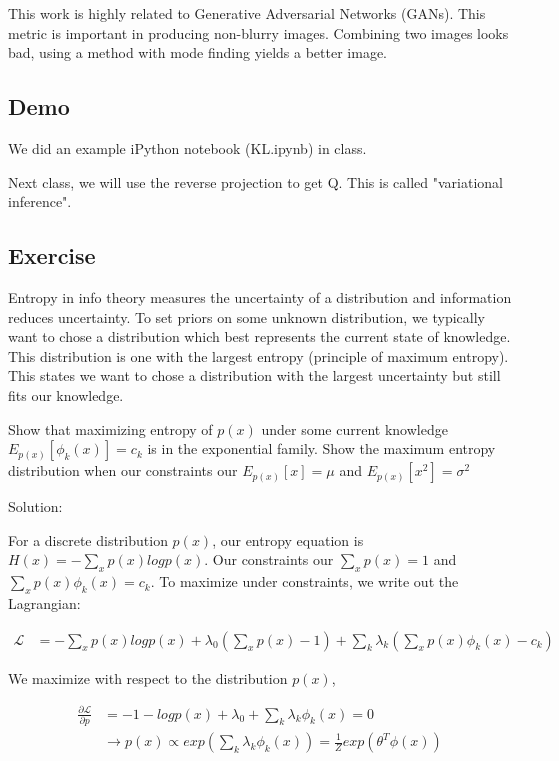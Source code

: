 \documentclass{article}
\begin{document}
\smallskip
This work is highly related to Generative Adversarial Networks (GANs). This metric is important in producing non-blurry images. Combining two images looks bad, using a method with mode finding yields a better image.

\subsection{Demo}

\smallskip
We did an example iPython notebook (KL.ipynb) in class.

\smallskip
Next class, we will use the reverse projection to get Q. This is called "variational inference".

\subsection{Exercise}

Entropy in info theory measures the uncertainty of a distribution and information reduces uncertainty. To set priors on some unknown distribution, we typically want to chose a distribution which best represents the current state of knowledge. This distribution is one with the largest entropy (principle of maximum entropy). This states we want to chose a distribution with the largest uncertainty but still fits our knowledge.

\smallskip

Show that maximizing entropy of $p(x)$ under some current knowledge $E_{p(x)}[\phi_k(x)] = c_k$ is in the exponential family. Show the maximum entropy distribution when our constraints our $E_{p(x)}[x] = \mu$ and $E_{p(x)}[x^2] = \sigma^2$ 

\bigskip

Solution:

\smallskip

For a discrete distribution $p(x)$, our entropy equation is $H(x) = - \sum_x p(x) log p(x)$. Our constraints our $\sum_x p(x) = 1$ and $ \sum_x p(x) \phi_k(x) = c_k$. To maximize under constraints, we write out the Lagrangian:

\begin{align*}
\mathcal{L} &= - \sum_x p(x) log p(x) + \lambda_0 (\sum_x p(x) - 1) + \sum_k \lambda_k (\sum_x p(x) \phi_k(x) - c_k)
\end{align*}

We maximize with respect to the distribution $p(x)$,

\begin{align*}
\frac{\partial \mathcal{L}}{\partial p} &= -1 - log p(x) + \lambda_0 + \sum_k \lambda_k \phi_k(x) = 0 \\
&\rightarrow p(x) \propto exp(\sum_k \lambda_k \phi_k(x)) = \frac{1}{Z}exp(\theta^T \phi(x))
\end{align*}
\end{document}
